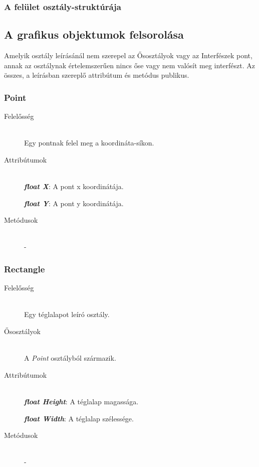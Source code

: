 \subsubsection{A felület osztály-struktúrája}

\subsection{A grafikus objektumok felsorolása}
Amelyik osztály leírásánál nem szerepel az Ősosztályok vagy az Interfészek pont, annak az osztálynak értelemszerűen nincs őse vagy nem valósít meg interfészt. Az összes, a leírásban szereplő attribútum és metódus publikus.

\subsubsection{Point}
	\begin{description}
		\item[Felelősség] \hfill \\
		Egy pontnak felel meg a koordináta-síkon.
		
		\item[Attribútumok]\hfill \\
		\textbf{\emph{float X}}: A pont x koordinátája.
		
		\textbf{\emph{float Y}}: A pont y koordinátája.		
				
		\item[Metódusok]\hfill \\
		-

	\end{description}
	
\subsubsection{Rectangle}
	\begin{description}
		\item[Felelősség] \hfill \\
		Egy téglalapot leíró osztály.
		
		\item[Ősosztályok] \hfill \\
		A {\itshape Point}	osztályból származik.		
		
		\item[Attribútumok]\hfill \\
		\textbf{\emph{float Height}}: A téglalap magassága.
		
		\textbf{\emph{float Width}}: A téglalap szélessége.		
				
		\item[Metódusok]\hfill \\
		-

	\end{description}
	
